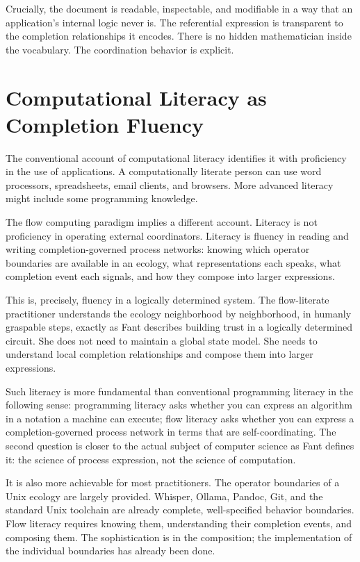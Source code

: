 \documentclass[12pt, a4paper]{article}
\begin{document}
Crucially, the document is readable, inspectable, and modifiable in
a way that an application's internal logic never is. The referential
expression is transparent to the completion relationships it
encodes. There is no hidden mathematician inside the vocabulary.
The coordination behavior is explicit.

\section{Computational Literacy as Completion Fluency}

The conventional account of computational literacy identifies it with
proficiency in the use of applications. A computationally literate
person can use word processors, spreadsheets, email clients, and
browsers. More advanced literacy might include some programming
knowledge.

The flow computing paradigm implies a different account. Literacy is
not proficiency in operating external coordinators. Literacy is
fluency in reading and writing completion-governed process networks:
knowing which operator boundaries are available in an ecology, what
representations each speaks, what completion event each signals, and
how they compose into larger expressions.

This is, precisely, fluency in a logically determined system. The
flow-literate practitioner understands the ecology neighborhood by
neighborhood, in humanly graspable steps, exactly as Fant describes
building trust in a logically determined circuit. She does not need
to maintain a global state model. She needs to understand local
completion relationships and compose them into larger expressions.

Such literacy is more fundamental than conventional programming
literacy in the following sense: programming literacy asks whether
you can express an algorithm in a notation a machine can execute;
flow literacy asks whether you can express a completion-governed
process network in terms that are self-coordinating. The second
question is closer to the actual subject of computer science as Fant
defines it: the science of process expression, not the science of
computation.

It is also more achievable for most practitioners. The operator
boundaries of a Unix ecology are largely provided. Whisper, Ollama,
Pandoc, Git, and the standard Unix toolchain are already complete,
well-specified behavior boundaries. Flow literacy requires knowing
them, understanding their completion events, and composing them.
The sophistication is in the composition; the implementation of the
individual boundaries has already been done.
\end{document}
